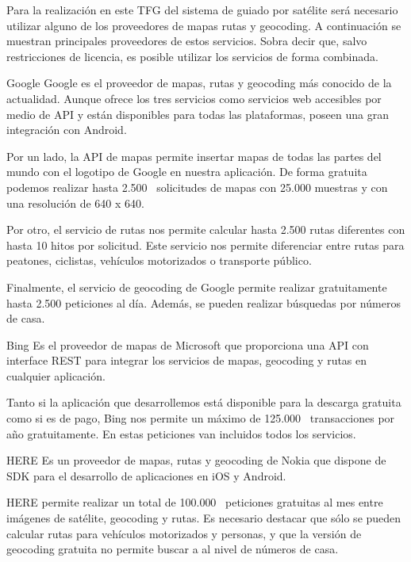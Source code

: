 Para la realización en este \acs{TFG} del sistema de guiado por satélite será necesario utilizar
alguno de los proveedores de mapas rutas y geocoding. A continuación se muestran principales
proveedores de estos servicios. Sobra decir que, salvo restricciones de licencia, es posible
utilizar los servicios de forma combinada.

\begin{definitionlist}
  \item[Google] Google es el proveedor de mapas, rutas y geocoding más conocido de la
    actualidad. Aunque ofrece los tres servicios como servicios web accesibles por medio de
    \acs{API} y están disponibles para todas las plataformas, poseen una gran integración con
    Android.

    Por un lado, la \acs{API} de mapas permite insertar mapas de todas las partes del mundo con el
    logotipo de Google en nuestra aplicación. De forma gratuita podemos realizar hasta
    2.500~\cite{LicenciaAndroid} solicitudes de mapas con 25.000 muestras y con una resolución de
    640 x 640.

    Por otro, el servicio de rutas nos permite calcular hasta 2.500 rutas diferentes con hasta 10
    hitos por solicitud. Este servicio nos permite diferenciar entre rutas para peatones, ciclistas,
    vehículos motorizados o transporte público.

    Finalmente, el servicio de geocoding de Google permite realizar gratuitamente hasta 2.500
    peticiones al día. Además, se pueden realizar búsquedas por números de casa.

  \item[Bing] Es el proveedor de mapas de Microsoft que proporciona una \acs{API} con interface
    \acf{REST} para integrar los servicios de mapas, geocoding y rutas en cualquier aplicación.

    Tanto si la aplicación que desarrollemos está disponible para la descarga gratuita como si es de
    pago, Bing nos permite un máximo de 125.000~\cite{LicenciaMicrosoft} transacciones por año
    gratuitamente. En estas peticiones van incluidos todos los servicios.

  \item[HERE] Es un proveedor de mapas, rutas y geocoding de Nokia que dispone de \acf{SDK} para el
    desarrollo de aplicaciones en iOS y Android.

    HERE permite realizar un total de 100.000~\cite{LicenciaHERE} peticiones gratuitas al mes entre
    imágenes de satélite, geocoding y rutas. Es necesario destacar que sólo se pueden calcular rutas
    para vehículos motorizados y personas, y que la versión de geocoding gratuita no permite buscar
    a al nivel de números de casa.


\end{definitionlist}
